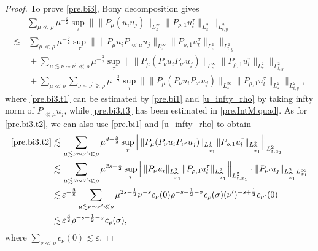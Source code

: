 \documentclass[11pt,letterpaper,reqno]{amsart}
\numberwithin{equation}{section}
\theoremstyle{definition}
\theoremstyle{remark}
\begin{document}
\begin{proof}
To prove \eqref{pre.bi3}, Bony decomposition gives
\begin{align}
     &\sum_{\mu \ll \rho} \mu^{-\frac 32} \sup_\tau  \Big\| \|    	 P_{  \mu } (u_i u_j) \|_{L^\infty_z} \|   P_{ \rho,1} u_l^\tau \|_{L^2_z}     \Big\|_{L^2_{t,y}}    \nonumber \\
     \lesssim &\,  \sum_{  \mu \ll \rho} \mu^{-\frac 32}\sup_\tau  \Big\| \|    	 P_{  \mu } u_i 
 P_{\ll \mu} u_j \|_{L^\infty_z} \|   P_{ \rho,1} u_l^\tau \|_{L^2_z}     \Big\|_{L^2_{t,y}} \label{pre.bi3.t1}\\
 &\,+  \sum_{\mu \lesssim \nu\sim \nu^\prime \ll \rho }\mu^{-\frac 32}\sup_\tau  \Big\| \|    	 P_{  \mu } (P_\nu u_i 
 P_{\nu'} u_j) \|_{L^\infty_z} \|   P_{ \rho,1} u_l^\tau \|_{L^2_z}     \Big\|_{L^2_{t,y}} \label{pre.bi3.t2} \\
 &\,+\sum_{  \mu \ll \rho} \sum_{  \nu\sim \nu^\prime \gtrsim \rho } \mu^{-\frac 32}\sup_\tau  \Big\| \|    	 P_{  \mu } (P_\nu u_i 
 P_{\nu'} u_j) \|_{L^\infty_z} \|   P_{ \rho,1} u_l^\tau \|_{L^2_z}     \Big\|_{L^2_{t,y}}, \label{pre.bi3.t3}
\end{align}
where  \eqref{pre.bi3.t1} can be estimated by \eqref{pre.bi1}  and  \eqref{u_infty_rho} by taking infty norm of \(P_{\ll \mu} u_j \), while   \eqref{pre.bi3.t3} has been estimated in \eqref{pre.IntM.quad}.
As for \eqref{pre.bi3.t2}, we can also use \eqref{pre.bi1}  and  \eqref{u_infty_rho} to obtain
\begin{align*}
     \eqref{pre.bi3.t2} \lesssim &\,  \sum_{\mu \lesssim \nu\sim \nu^\prime \ll \rho }\mu^{d-\frac 52}\sup_\tau  \Big\| \|    	 P_{  \mu } (P_\nu u_i 
 P_{\nu'} u_j) \|_{L^1_{\widehat{x}_1}} \|   P_{ \rho,1} u_l^\tau \|_{L^2_{\widehat{x}_1}}     \Big\|_{L^2_{t,x_1}} \\
 \lesssim &\,  \sum_{\mu \lesssim \nu\sim \nu^\prime \ll \rho }\mu^{2s-\frac 12}\sup_\tau  \Big\| \|    	 P_\nu u_i 
\|_{L^2_{\widehat{x}_1}} \|   P_{ \rho,1} u_l^\tau \|_{L^2_{\widehat{x}_1}}     \Big\|_{L^2_{t,x_1}} \cdot \| P_{\nu'} u_j \|_{L^2_{\widehat{x}_1} L^\infty_{x_1}} \\
\lesssim &\,  \varepsilon^{-\frac 38} \sum_{\mu \lesssim \nu\sim \nu^\prime \ll \rho }\mu^{2s-\frac 12}  \nu^{-s} c_\nu (0 ) \rho^{-s-\frac12-\sigma} c_\rho(\sigma) (\nu')^{-s+\frac 12} c_{\nu'} (0) \\
\lesssim &\, \varepsilon^{\frac 32} \rho^{-s-\frac12-\sigma} c_\rho(\sigma),
\end{align*}
where \(\sum_{\nu \ll \rho}   c_{\nu} (0) \lesssim \varepsilon\).




\end{proof}
\end{document}
